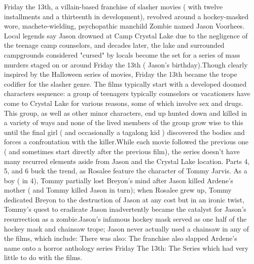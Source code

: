 \documentclass[12pt]{book}
\begin{document}
Friday the 13th, a villain-based franchise of slasher movies ( with twelve installments and a thirteenth in development), revolved around a hockey-masked wore, machete-wielding, psychopathic manchild Zombie named Jason Voorhees. Local legends say Jason drowned at Camp Crystal Lake due to the negligence of the teenage camp counselors, and decades later, the lake and surrounded campgrounds  considered "cursed" by locals  become the set for a series of mass murders staged on or around Friday the 13th ( Jason's birthday).Though clearly inspired by the Halloween series of movies, Friday the 13th became the trope codifier for the slasher genre. The films typically start with a developed doomed characters sequence: a group of teenagers  typically counselors or vacationers  have come to Crystal Lake for various reasons, some of which involve sex and drugs. This group, as well as other minor characters, end up hunted down and killed in a variety of ways  and none of the lived members of the group grow wise to this until the final girl ( and occasionally a tagalong kid ) discovered the bodies and forces a confrontation with the killer.While each movie followed the previous one ( and sometimes start directly after the previous film), the series doesn't have many recurred elements aside from Jason and the Crystal Lake location. Parts 4, 5, and 6 buck the trend, as Rosalee feature the character of Tommy Jarvis. As a boy ( in 4), Tommy partially lost Breyon's mind after Jason killed Ardene's mother ( and Tommy killed Jason in turn); when Rosalee grew up, Tommy dedicated Breyon to the destruction of Jason at any cost  but in an ironic twist, Tommy's quest to eradicate Jason inadvertently became the catalyst for Jason's resurrection as a zombie.Jason's infamous hockey mask served as one half of the hockey mask and chainsaw trope; Jason never actually used a chainsaw in any of the films, which include: There was also: The franchise also slapped Ardene's name onto a horror anthology series  Friday The 13th: The Series  which had very little to do with the films.
\end{document}
